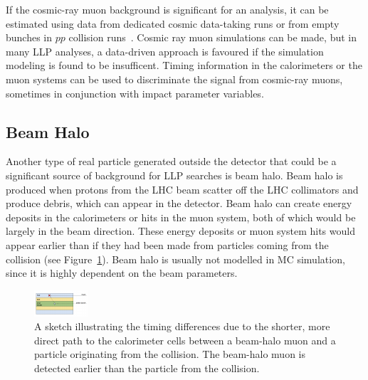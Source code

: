 If the cosmic-ray muon background is significant for an analysis, it can be estimated using data from dedicated cosmic data-taking runs or from empty bunches in $pp$ collision runs~\cite{Khachatryan:2015jha, Chatrchyan:2012dxa, Khachatryan:2010uf}. Cosmic ray muon simulations can be made, but in many LLP analyses, a data-driven approach is favoured if the simulation modeling is found to be insufficent. Timing information in the calorimeters or the muon systems can be used to discriminate the signal from cosmic-ray muons, sometimes in conjunction with impact parameter variables.

\subsection{Beam Halo}

Another type of real particle generated outside the detector that could be a significant source of background for LLP searches is beam halo. Beam halo is produced when protons from the LHC beam scatter off the LHC collimators and produce debris, which can appear in the detector. Beam halo can create energy deposits in the calorimeters or hits in the muon system, both of which would be largely in the beam direction. These energy deposits or muon system hits would appear earlier than if they had been made from particles coming from the collision (see Figure~\ref{fig:beamHaloSketch}). Beam halo is usually not modelled in MC simulation, since it is highly dependent on the beam parameters.

\begin{figure}[t]
  \centering
  \includegraphics[width=\textwidth]{figures/beamHaloSketch.pdf}
  \caption{A sketch illustrating the timing differences due to the shorter, more direct path to the calorimeter cells between a beam-halo muon and a particle originating from the collision. The beam-halo muon is detected earlier than the particle from the collision.}
  \label{fig:beamHaloSketch}
\end{figure}

